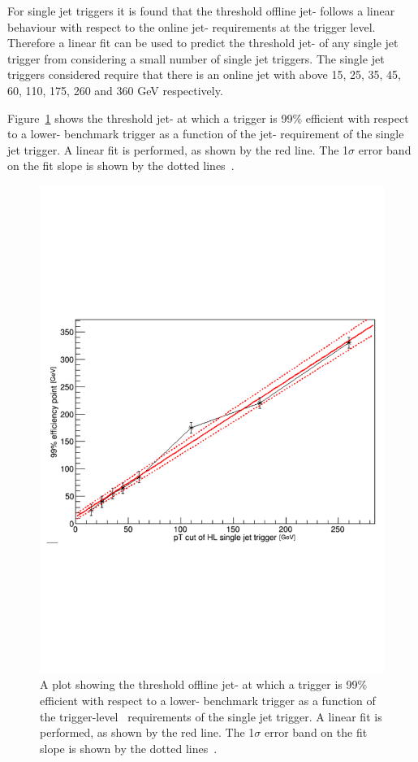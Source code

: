 For single jet triggers it is found that the threshold offline jet-\pT{} follows
a linear behaviour with respect to the online jet-\pT{} requirements at the trigger level.
Therefore a linear fit can be used to predict the threshold jet-\pT{} of any single jet trigger
from considering a small number of single jet triggers.
The single jet triggers considered require that there is an online jet with \pT{} above
15, 25, 35, 45, 60, 110, 175, 260 and 360 GeV respectively.

Figure~\ref{fig:triggerTurnOn_fit} shows the threshold jet-\pT{} 
at which a trigger is 99\% efficient with respect to a lower-\pT{} benchmark trigger
as a function of the jet-\pT{} requirement of the single jet trigger.
A linear fit is performed, as shown by the red line.
The 1$\sigma$ error band on the fit slope is shown by the dotted lines~\cite{evt-jet_turnOnFit}.

\begin{figure}[!hbt]
    \begin{center}
        \includegraphics[width=0.7\linewidth, angle=0]{figs/Dibjet/LowMass/jetTriggerTurnOn.pdf}
      \end{center}
  \caption[A plot showing the threshold jet-\pT{} of a single jet trigger as a function of the trigger-level jet-\pT{} requirements.]
           {A plot showing the threshold offline jet-\pT{} at which a trigger is 99\% efficient
             with respect to a lower-\pT{} benchmark trigger as a function of the trigger-level~\pT{} requirements of the single jet trigger.
             A linear fit is performed, as shown by the red line. The 1$\sigma$ error band on the fit slope is shown by the dotted lines~\cite{evt-jet_turnOnFit}.}
          \label{fig:triggerTurnOn_fit}
\end{figure}

